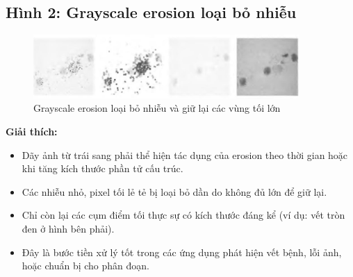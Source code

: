 \documentclass[12pt]{article}
\begin{document}
	\subsection{Hình 2: Grayscale erosion loại bỏ nhiễu}
	
	\begin{figure}[h!]
		\centering
		\includegraphics[width=0.9\textwidth]{images/31_2.png}
		\caption{Grayscale erosion loại bỏ nhiễu và giữ lại các vùng tối lớn}
		\label{fig:erosion_dots}
	\end{figure}
	
	\textbf{Giải thích:}
	\begin{itemize}
		\item Dãy ảnh từ trái sang phải thể hiện tác dụng của erosion theo thời gian hoặc khi tăng kích thước phần tử cấu trúc.
		\item Các nhiễu nhỏ, pixel tối lẻ tẻ bị loại bỏ dần do không đủ lớn để giữ lại.
		\item Chỉ còn lại các cụm điểm tối thực sự có kích thước đáng kể (ví dụ: vết tròn đen ở hình bên phải).
		\item Đây là bước tiền xử lý tốt trong các ứng dụng phát hiện vết bệnh, lỗi ảnh, hoặc chuẩn bị cho phân đoạn.
	\end{itemize}
	
	
	
\end{document}
